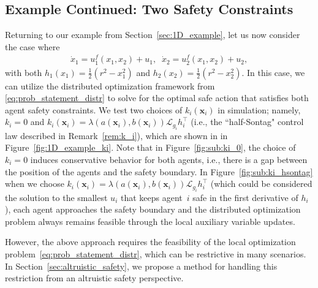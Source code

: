 \documentclass[letterpaper, 10 pt, conference]{ieeeconf}  %
\theoremstyle{plain}
\begin{document}
\subsection{\textbf{Example Continued:} Two Safety Constraints} \label{sec:sub:two_constraints}
Returning to our example from Section~\ref{sec:1D_example}, let us now consider the case where
\begin{equation} \label{eq:2agent_1D_dyn_2inputs}
    \begin{aligned}
        \dot{x}_1 = u^f_1(x_1, x_2) + u_1, \;\; \dot{x}_2 = u^f_2(x_1, x_2) + u_2,
    \end{aligned}
\end{equation}
with both $h_1(x_1) = \frac{1}{2}\left(r^2 - x_1^2\right)$ and $h_2(x_2) = \frac{1}{2}\left(r^2 - x_2^2\right)$. In this case, we can utilize the distributed optimization framework from \eqref{eq:prob_statement_distr} to solve for the optimal safe action that satisfies both agent safety constraints.  
We test two choices of $k_i(\mathbf{x}_i)$ in simulation; namely, $k_i = 0$ and $k_i(\mathbf{x}_i)=  \lambda(a(\mathbf{x}_i) , b(\mathbf{x}_i)) \mathcal{L}_{g_i} h_i^{\top}$ (i.e., the ``half-Sontag" control law described in Remark~\ref{rem:k_i}), which are shown in in Figure~\ref{fig:1D_example_ki}. Note that in Figure~\ref{fig:sub:ki_0}, the choice of $k_i = 0$ induces conservative behavior for both agents, i.e., there is a gap between the position of the agents and the safety boundary. In Figure~\ref{fig:sub:ki_hsontag} when we choose $k_i(\mathbf{x}_i)=  \lambda(a(\mathbf{x}_i) , b(\mathbf{x}_i)) \mathcal{L}_{g_i} h_i^{\top}$ (which could be considered the solution to the smallest $u_i$ that keeps agent~$i$ safe in the first derivative of $h_i$), each agent approaches the safety boundary and the distributed optimization problem always remains feasible through the local auxiliary variable updates.

 However, the above approach requires the feasibility of the local optimization problem~\eqref{eq:prob_statement_distr}, which can be restrictive in many scenarios. In Section~\ref{sec:altruistic_safety}, we propose a method for handling this restriction from an altruistic safety perspective.
\end{document}
